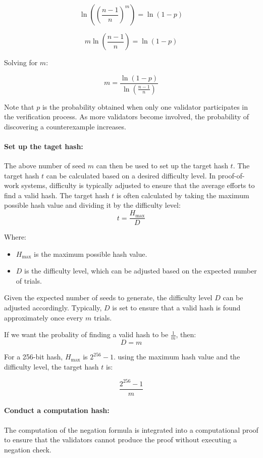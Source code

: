 \documentclass[runningheads]{llncs}
\begin{document}
\[
\ln\left(\left(\frac{n-1}{n}\right)^m\right) = \ln(1 - p)
\]

\[
m \ln\left(\frac{n-1}{n}\right) = \ln(1 - p)
\]

Solving for \( m \):

\[
m = \frac{\ln(1 - p)}{\ln\left(\frac{n-1}{n}\right)}
\]

Note that $p$ is the probability obtained when only one validator participates in the verification process. As more validators become involved, the probability of discovering a counterexample increases.
\paragraph{Set up the taget hash:}
The above number of seed $m$ can then be used to set up the target hash $t$. The target hash $t$ can be calculated based on a desired difficulty level. In proof-of-work systems, difficulty is typically adjusted to ensure that the average efforts to find a valid hash. The target hash $t$ is often calculated by taking the maximum possible hash value and dividing it by the difficulty level:
\[
t = \frac{H_{\text{max}}}{D}
\]

Where:
\begin{itemize}
  \item \( H_{\text{max}} \) is the maximum possible hash value.
  \item \( D \) is the difficulty level, which can be adjusted based on the expected number of trials.
\end{itemize}


Given the expected number of seeds to generate, 
the difficulty level $D$ can be adjusted accordingly. Typically, $D$ is set to ensure that a valid hash is found approximately once every $m$ trials.

If we want the probality of finding a valid hash to be $\frac{1}{m}$, then:
\[
D=m
\]

For a 256-bit hash, $H_{\text{max}}$ is $2^{256} - 1 $.  using the maximum hash value and the difficulty level, the target hash $t$ is:
    
\[
\frac{2^{256} - 1}{m}
\]
\paragraph{Conduct a computation hash:} The computation of the negation formula is integrated into a computational proof to ensure that the validators cannot produce the proof without executing a negation check.
\end{document}
